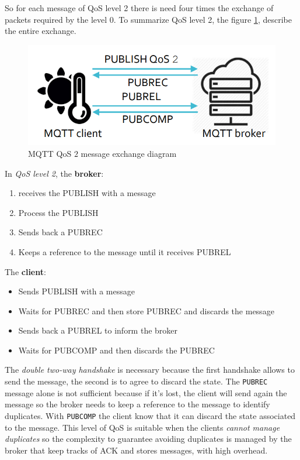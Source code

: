 \documentclass[10pt,a4paper]{report}
\theoremstyle{definition}
\begin{document}
So for each message of QoS level 2 there is need four times the exchange of packets required by the level 0.
To summarize QoS level 2, the figure \ref{mqtt-qos-2}, describe the entire exchange.
\begin{figure}[h]
	\centering
	\includegraphics[scale=0.50]{images/Pasted image 20230304093804.png}
	\caption{MQTT QoS $2$ message exchange diagram}\label{mqtt-qos-2}\end{figure}

In \textit{QoS level 2}, the \textbf{broker}:
\begin{enumerate}
	\item 
	receives the PUBLISH with a message
	\item 
	Process the PUBLISH
	\item 
	Sends back a PUBREC
	\item 
	Keeps a reference to the message until it receives PUBREL
\end{enumerate}

The \textbf{client}:
\begin{itemize}
	\item 
Sends PUBLISH with a message
\item 
Waits for PUBREC and then store PUBREC and discards the message
\item 
Sends back a PUBREL to inform the broker
\item 
Waits for PUBCOMP and then discards the PUBREC	
\end{itemize}



The \textit{double two-way handshake} is necessary because the first handshake allows to send the message, the second is to agree to discard the state. The \texttt{PUBREC} message alone is not sufficient because if it's lost, the client will send again the message so the broker needs to keep a reference to the message to identify duplicates. With \texttt{PUBCOMP} the client know that it can discard the state associated to the message.
This level of QoS is suitable when the clients \textit{cannot manage duplicates} so the complexity to guarantee avoiding duplicates is managed by the broker that keep tracks of ACK and stores messages, with high overhead.
\end{document}
